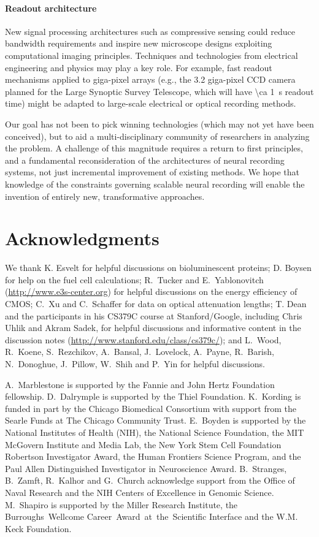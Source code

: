 \paragraph{Readout architecture} New signal processing architectures such as compressive sensing could reduce bandwidth requirements and inspire new microscope designs exploiting computational imaging principles. Techniques and technologies from electrical engineering and physics may play a key role. For example, fast readout mechanisms \cite{lauxtermann2001mega} applied to giga-pixel arrays (e.g., the 3.2 giga-pixel CCD camera planned for the Large Synoptic Survey Telescope, which will have \SI{\ca 1}{\second} readout time) might be adapted to large-scale electrical or optical recording methods.

Our goal has not been to pick winning technologies (which may not yet have been conceived), but to aid a multi-disciplinary community of researchers in analyzing the problem. 
A challenge of this magnitude requires a return to first principles, and a fundamental reconsideration of the architectures of neural recording systems, not just incremental improvement of existing methods.
We hope that knowledge of the constraints governing scalable neural recording will enable the invention of entirely new, transformative approaches.

\section{Acknowledgments}

We thank K. Esvelt for helpful discussions on bioluminescent proteins; D. Boysen for help on the fuel cell calculations; R.~Tucker and E.~Yablonovitch (\url{http://www.e3s-center.org}) for helpful discussions on the energy efficiency of CMOS; C.~Xu and C.~Schaffer for data on optical attenuation lengths; T. Dean and the participants in his CS379C course at Stanford/Google, including Chris Uhlik and Akram Sadek, for helpful discussions and informative content in the discussion notes (\url{http://www.stanford.edu/class/cs379c/}); and L.~Wood, R.~Koene, S.~Rezchikov, A.~Bansal, J.~Lovelock, A.~Payne, R.~Barish, N.~Donoghue, J.~Pillow, W.~Shih and P.~Yin for helpful discussions.

A.~Marblestone is supported by the Fannie and John Hertz Foundation fellowship.
D.~Dalrymple is supported by the Thiel Foundation.
K.~Kording is funded in part by the Chicago Biomedical Consortium with support from the Searle Funds at The Chicago Community Trust.
E.~Boyden is supported by the National Institutes of Health (NIH), the National Science Foundation, the MIT
McGovern Institute and Media Lab, the New York Stem Cell Foundation Robertson Investigator
Award, the Human Frontiers Science Program, and the Paul Allen Distinguished Investigator in
Neuroscience Award.
B.~Stranges, B.~Zamft, R.~Kalhor and G.~Church acknowledge support from the Office of Naval Research and the NIH Centers of Excellence in Genomic Science.
M.~Shapiro is supported by the Miller Research Institute, the Burroughs~Wellcome Career~Award~at~the~Scientific Interface and the W.M. Keck Foundation.

\printbibliography[notsubtype=hide]


